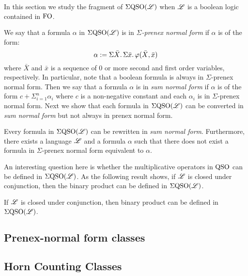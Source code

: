 
In this section we study the fragment of $\Sigma{\rm QSO}(\mathscr{L})$ when $\mathscr{L}$ is a boolean logic contained in ${\rm FO}$. 

We say that a formula $\alpha$ in $\Sigma{\rm QSO}(\mathscr{L})$ is in \emph{$\Sigma$-prenex normal form} if $\alpha$ is of the form:
\[
\alpha := \Sigma{\bar{X}}.\, \Sigma{\bar{x}}.\, \varphi(\bar{X}, \bar{x})
\]
where $\bar{X}$ and $\bar{x}$ is a sequence of $0$ or more second and first order variables, respectively.
In particular, note that a boolean formula is always in $\Sigma$-prenex normal form.
Then we say that a formula $\alpha$ is in \emph{sum normal form} if $\alpha$ is of the form $c + \Sigma_{i=1}^n \alpha_i$ where $c$ is a non-negative constant and each $\alpha_i$ is in $\Sigma$-prenex normal form.
Next we show that each formula in $\Sigma{\rm QSO}(\mathscr{L})$ can be converted in \emph{sum normal form} but not always in prenex normal form.

\begin{theorem}
	Every formula in $\Sigma{\rm QSO}(\mathscr{L})$ can be rewritten in \emph{sum normal form}. Furthermore, there exists a language $\mathscr{L}$ and a formula $\alpha$ such that there does not exist a formula in $\Sigma$-prenex normal form equivalent to $\alpha$.
\end{theorem}

An interesting question here is whether the multiplicative operators in ${\rm QSO}$ can be defined in $\Sigma{\rm QSO}(\mathscr{L})$. As the following result shows, if $\mathscr{L}$ is closed under conjunction, then the binary product can be defined in  $\Sigma{\rm QSO}(\mathscr{L})$.

\begin{theorem}\label{theo:binary-prod}
	If $\mathscr{L}$ is closed under conjunction, then binary product can be defined in $\Sigma{\rm QSO}(\mathscr{L})$.
\end{theorem}

\subsection{Prenex-normal form classes}


\subsection{Horn Counting Classes}

